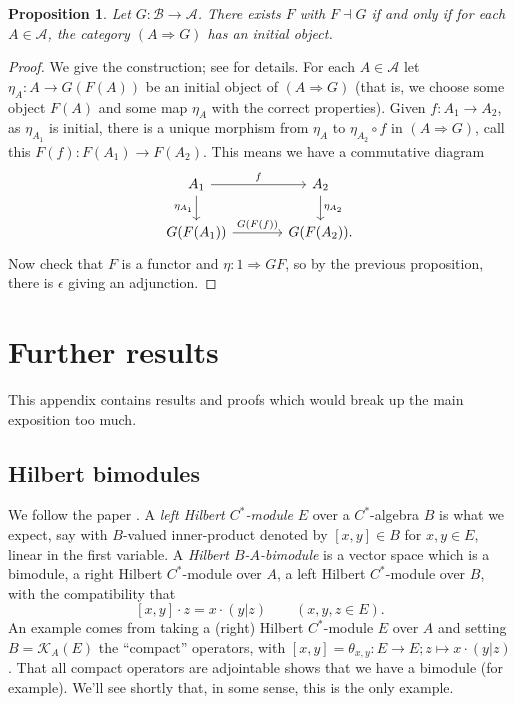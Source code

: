 \documentclass[a4paper,11pt]{article}
\theoremstyle{plain}
\newtheorem{proposition}{Proposition}[section]
\theoremstyle{remark}
\newcommand{\mc}[1]{\mathcal{#1}}
\begin{document}
\begin{proposition}
Let $G\colon \mc B \to \mc A$.  There exists $F$ with $F \dashv G$ if and only if for each $A\in\mc A$, the category $(A\Rightarrow G)$ has an initial object.
\end{proposition}
\begin{proof}
We give the construction; see \cite[Corollary~2.3.7]{Leinster_BasicCatTheory} for details.  For each $A\in\mc A$ let $\eta_A \colon A \to G(F(A))$ be an initial object of $(A\Rightarrow G)$ (that is, we choose some object $F(A)$ and some map $\eta_A$ with the correct properties).  Given $f\colon A_1\to A_2$, as $\eta_{A_1}$ is initial, there is a unique morphism from $\eta_A$ to $\eta_{A_2} \circ f$ in $(A\Rightarrow G)$, call this $F(f) \colon F(A_1) \to F(A_2)$.  This means we have a commutative diagram
\[ \begin{tikzcd}[column sep=large]
A_1 \arrow[d, "\eta_{A_1}"']     %
    \arrow[r, "f"]  & A_2  \arrow[d, "\eta_{A_2}"]         \\
G(F(A_1))   \arrow[r, "G(F(f))"] &  G(F(A_2)).
\end{tikzcd} \]
Now check that $F$ is a functor and $\eta \colon 1 \Rightarrow GF$, so by the previous proposition, there is $\epsilon$ giving an adjunction.
\end{proof}



\section{Further results}

This appendix contains results and proofs which would break up the main exposition too much.


\subsection{Hilbert bimodules}\label{sec:bimod}

We follow the paper \cite{BMS_quasimults}.  A \emph{left Hilbert $C^*$-module} $E$ over a $C^*$-algebra $B$ is what we expect, say with $B$-valued inner-product denoted by $[x,y] \in B$ for $x,y\in E$, linear in the first variable.  A \emph{Hilbert $B$-$A$-bimodule} is a vector space which is a bimodule, a right Hilbert $C^*$-module over $A$, a left Hilbert $C^*$-module over $B$, with the compatibility that
\[ [x,y] \cdot z = x \cdot (y|z) \qquad (x,y,z\in E). \]
An example comes from taking a (right)  Hilbert $C^*$-module $E$ over $A$ and setting $B=\mc K_A(E)$ the ``compact'' operators, with $[x,y] = \theta_{x,y} \colon E \to E; z\mapsto x\cdot(y|z)$.  That all compact operators are adjointable shows that we have a bimodule (for example).  We'll see shortly that, in some sense, this is the only example.
\end{document}
